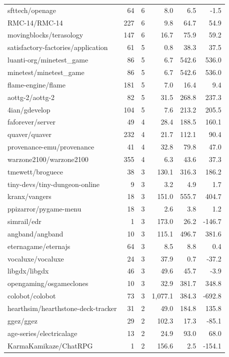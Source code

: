 \begin{center}
{\begin{longtable}{@{}lrrrrr@{}}
sfttech/openage & 64 & 6 & 8.0 & 6.5 & -1.5 \\
RMC-14/RMC-14 & 227 & 6 & 9.8 & 64.7 & 54.9 \\
movingblocks/terasology & 147 & 6 & 16.7 & 75.9 & 59.2 \\
satisfactory-factories/application & 61 & 5 & 0.8 & 38.3 & 37.5 \\
luanti-org/minetest\_game & 86 & 5 & 6.7 & 542.6 & 536.0 \\
minetest/minetest\_game & 86 & 5 & 6.7 & 542.6 & 536.0 \\
flame-engine/flame & 181 & 5 & 7.0 & 16.4 & 9.4 \\
aottg-2/aottg-2 & 82 & 5 & 31.5 & 268.8 & 237.3 \\
4ian/gdevelop & 104 & 5 & 7.6 & 213.2 & 205.5 \\
faforever/server & 49 & 4 & 28.4 & 188.5 & 160.1 \\
quaver/quaver & 232 & 4 & 21.7 & 112.1 & 90.4 \\
provenance-emu/provenance & 41 & 4 & 32.8 & 79.8 & 47.0 \\
warzone2100/warzone2100 & 355 & 4 & 6.3 & 43.6 & 37.3 \\
tmewett/broguece & 38 & 3 & 130.1 & 316.3 & 186.2 \\
tiny-devs/tiny-dungeon-online & 9 & 3 & 3.2 & 4.9 & 1.7 \\
kranx/vangers & 18 & 3 & 151.0 & 555.7 & 404.7 \\
ppizarror/pygame-menu & 18 & 3 & 2.6 & 3.8 & 1.2 \\
simrail/edr & 1 & 3 & 173.0 & 26.2 & -146.7 \\
angband/angband & 10 & 3 & 115.1 & 496.7 & 381.6 \\
eternagame/eternajs & 64 & 3 & 8.5 & 8.8 & 0.4 \\
vocaluxe/vocaluxe & 24 & 3 & 37.9 & 0.7 & -37.2 \\
libgdx/libgdx & 46 & 3 & 49.6 & 45.7 & -3.9 \\
opengaming/osgameclones & 10 & 3 & 32.9 & 381.7 & 348.8 \\
colobot/colobot & 73 & 3 & 1,077.1 & 384.3 & -692.8 \\
hearthsim/hearthstone-deck-tracker & 31 & 2 & 49.0 & 184.8 & 135.8 \\
ggez/ggez & 29 & 2 & 102.3 & 17.3 & -85.1 \\
age-series/electricalage & 13 & 2 & 24.9 & 93.0 & 68.0 \\
KarmaKamikaze/ChatRPG & 1 & 2 & 156.6 & 2.5 & -154.1 \\

\end{longtable}}
\end{center}
